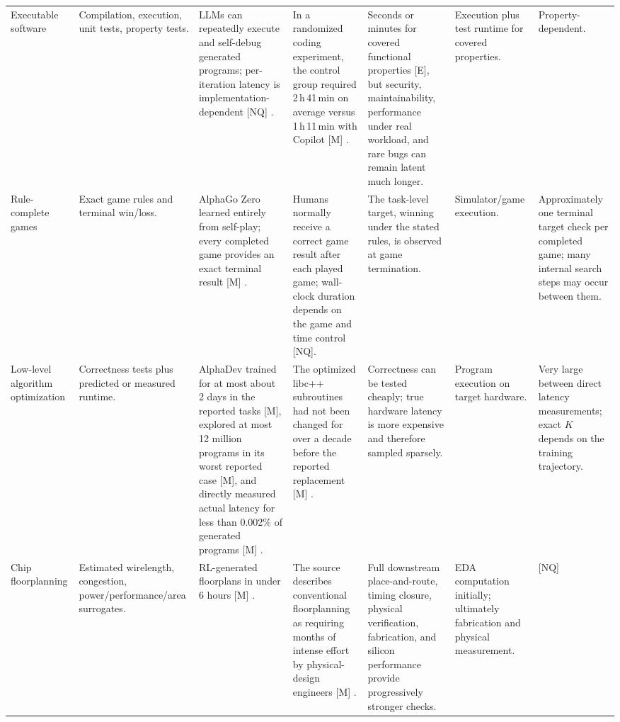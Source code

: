 \begin{landscape}
\begin{center}
\begin{longtable}{
    @{}
    p{2.0cm}
    p{3.0cm}
    p{2.85cm}
    p{2.75cm}
    p{3.05cm}
    p{2.75cm}
    p{2.55cm}
    @{}
}
\\[3pt]

Executable software
&
Compilation, execution, unit tests, property tests.
&
LLMs can repeatedly execute and self-debug generated programs;
per-iteration latency is implementation-dependent [NQ]
\parencite{chen2023selfdebug}.
&
In a randomized coding experiment, the control group required
2\,h\,41\,min on average versus 1\,h\,11\,min with Copilot [M]
\parencite{peng2023copilot}.
&
Seconds or minutes for covered functional properties [E], but security,
maintainability, performance under real workload, and rare bugs can
remain latent much longer.
&
Execution plus test runtime for covered properties.
&
Property-dependent.

\\[3pt]

Rule-complete games
&
Exact game rules and terminal win/loss.
&
AlphaGo Zero learned entirely from self-play; every completed game
provides an exact terminal result [M] \parencite{silver2017alphagozero}.
&
Humans normally receive a correct game result after each played game;
wall-clock duration depends on the game and time control [NQ].
&
The task-level target, winning under the stated rules, is observed at
game termination.
&
Simulator/game execution.
&
Approximately one terminal target check per completed game; many
internal search steps may occur between them.

\\[3pt]

Low-level algorithm optimization
&
Correctness tests plus predicted or measured runtime.
&
AlphaDev trained for at most about 2 days in the reported tasks [M],
explored at most 12 million programs in its worst reported case [M],
and directly measured actual latency for less than 0.002\% of generated
programs [M] \parencite{mankowitz2023alphadev}.
&
The optimized libc++ subroutines had not been changed for over a
decade before the reported replacement [M]
\parencite{mankowitz2023alphadev}.
&
Correctness can be tested cheaply; true hardware latency is more
expensive and therefore sampled sparsely.
&
Program execution on target hardware.
&
Very large between direct latency measurements; exact $K$ depends on
the training trajectory.

\\[3pt]

Chip floorplanning
&
Estimated wirelength, congestion, power/performance/area surrogates.
&
RL-generated floorplans in under 6 hours [M]
\parencite{mirhoseini2021chip}.
&
The source describes conventional floorplanning as requiring months of
intense effort by physical-design engineers [M]
\parencite{mirhoseini2021chip}.
&
Full downstream place-and-route, timing closure, physical verification,
fabrication, and silicon performance provide progressively stronger
checks.
&
EDA computation initially; ultimately fabrication and physical
measurement.
&
[NQ]


\end{longtable}
\end{center}
\end{landscape}
